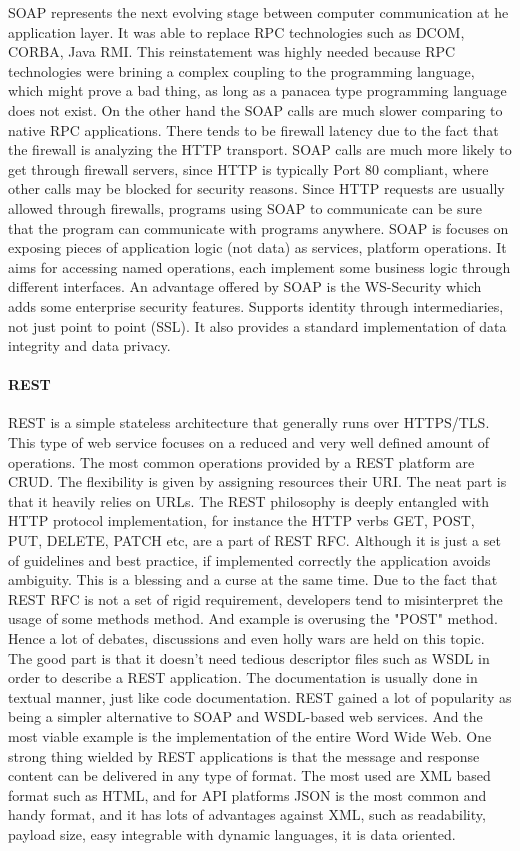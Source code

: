 SOAP represents the next evolving stage between computer communication at he application layer. It was able to replace RPC technologies such as DCOM, CORBA, Java RMI. This reinstatement was highly needed because RPC technologies were brining a complex coupling to the programming language, which might prove a bad thing, as long as a panacea type programming language does not exist. On the other hand the SOAP calls are much slower comparing to native RPC applications. There tends to be firewall latency due to the fact that the firewall is analyzing the HTTP transport. SOAP calls are much more likely to get through firewall servers, since HTTP is typically Port 80 compliant, where other calls may be blocked for security reasons. Since HTTP requests are usually allowed through firewalls, programs using SOAP to communicate can be sure that the program can communicate with programs anywhere. SOAP is focuses on exposing pieces of application logic (not data) as services, platform operations. It aims for accessing named operations, each implement some business logic through different interfaces. An advantage offered by SOAP is the WS-Security which adds some enterprise security features. Supports identity through intermediaries, not just point to point (SSL). It also provides a standard implementation of data integrity and data privacy.

\paragraph{REST}
REST is a simple stateless architecture that generally runs over HTTPS/TLS.
This type of web service focuses on a reduced and very well defined amount of operations. The most common operations provided by a REST platform are CRUD. 
The flexibility is given by assigning resources their URI. The neat part is that it heavily relies on URLs. The REST philosophy is deeply entangled with HTTP protocol implementation, for instance the HTTP verbs GET, POST, PUT, DELETE, PATCH etc, are a part of REST RFC. Although it is just a set of guidelines and best practice, if implemented correctly the application avoids ambiguity. This is a blessing and a curse at the same time. Due to the fact that REST RFC is not a set of rigid requirement, developers tend to misinterpret the usage of some methods method. And example is overusing the "POST" method. Hence a lot of debates, discussions and even holly wars are held on this topic. The good part is that it doesn't need tedious descriptor files such as WSDL in order to describe a REST application. The documentation is usually done in textual manner, just like code documentation. REST gained a lot of popularity as being a simpler alternative to SOAP and WSDL-based web services. And the most viable example is the implementation of the entire Word Wide Web. One strong thing wielded by REST applications is that the message and response content can be delivered in any type of format. The most used are XML based format such as HTML, and for API platforms JSON is the most common and handy format, and it has lots of advantages against XML, such as readability, payload size, easy integrable with dynamic languages, it is data oriented.

